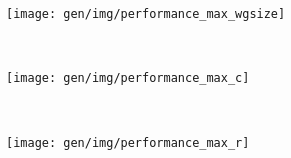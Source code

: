 \begin{subfigure}[h]{\textwidth}
\centering
\texttt{[image: gen/img/performance\_max\_wgsize]}
\vspace{-1.5em} %
\caption{}
\label{fig:performance-max-wgsize}
\end{subfigure}
\\
\begin{subfigure}[h]{.48\textwidth}
\centering
\texttt{[image: gen/img/performance\_max\_c]}
\vspace{-1.5em} %
\caption{}
\label{fig:performance-wg-c}
\end{subfigure}
~%
\begin{subfigure}[h]{.48\textwidth}
\centering
\texttt{[image: gen/img/performance\_max\_r]}
\vspace{-1.5em} %
\caption{}
\label{fig:performance-wg-r}
\end{subfigure}
